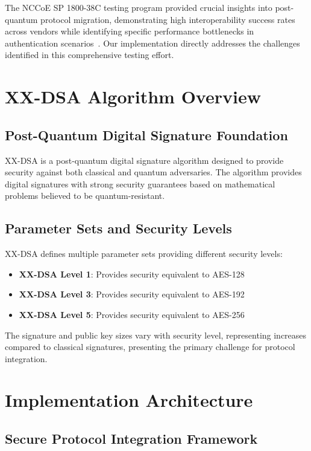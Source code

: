 \documentclass[journal=tches,final]{iacrtrans}
\begin{document}
The NCCoE SP 1800-38C testing program provided crucial insights into post-quantum protocol migration, demonstrating high interoperability success rates across vendors while identifying specific performance bottlenecks in authentication scenarios~\cite{NCCoE-SP1800-38C}. Our implementation directly addresses the challenges identified in this comprehensive testing effort.

\section{XX-DSA Algorithm Overview}

\subsection{Post-Quantum Digital Signature Foundation}

XX-DSA is a post-quantum digital signature algorithm designed to provide security against both classical and quantum adversaries. The algorithm provides digital signatures with strong security guarantees based on mathematical problems believed to be quantum-resistant.

\subsection{Parameter Sets and Security Levels}

XX-DSA defines multiple parameter sets providing different security levels:
\begin{itemize}
    \item \textbf{XX-DSA Level 1}: Provides security equivalent to AES-128
    \item \textbf{XX-DSA Level 3}: Provides security equivalent to AES-192  
    \item \textbf{XX-DSA Level 5}: Provides security equivalent to AES-256
\end{itemize}

The signature and public key sizes vary with security level, representing increases compared to classical signatures, presenting the primary challenge for protocol integration.

\section{Implementation Architecture}

\subsection{Secure Protocol Integration Framework}
\end{document}
